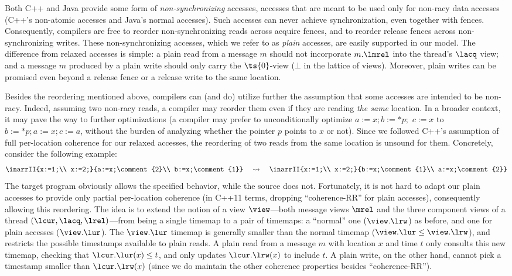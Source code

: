Both C++ and Java provide some form of \emph{non-synchronizing} accesses, \ie accesses that are meant to be used only for non-racy data accesses
(C++'s non-atomic accesses and Java's normal accesses).
Such accesses can never achieve synchronization, even together with fences.
Consequently, compilers are free to reorder non-synchronizing reads across acquire fences, and to reorder release fences across non-synchronizing writes.
These non-synchronizing accesses, which we refer to as \emph{plain} accesses, are easily supported in our model.
The difference from relaxed accesses is simple:
a plain read from a message $m$ should not incorporate $m.\lmrel$ into the thread's $\lacq$ view;
and a message $m$ produced by a plain write should only carry the $\ts{0}$-view (\ie $\bot$ in the lattice of views).
Moreover, plain writes can be promised even beyond a release fence or a release write to the same location.

Besides the reordering mentioned above, compilers can (and do) utilize further the assumption that some accesses 
are intended to be non-racy.
Indeed, assuming two non-racy reads, a compiler may reorder them even if they are reading \emph{the same} location.
In a broader context, it may pave the way to further optimizations 
(\eg a compiler may prefer to unconditionally optimize $a:=x; b:=*p;$ $c:=x$ to $b:=*p; a:=x; c:=a$, 
without the burden of analyzing whether the pointer $p$ points to $x$ or not).
Since we followed C++'s assumption of full per-location coherence for our relaxed accesses, 
the reordering of two reads from the same location is unsound for them. 
Concretely, consider the following example:
$$
\inarrII{x:=1;\\ x:=2;}{a:=x;\comment{2}\\ b:=x;\comment{1}} \quad \leadsto \quad
\inarrII{x:=1;\\ x:=2;}{b:=x;\comment{1}\\ a:=x;\comment{2}}
$$
The target program obviously allows the specified behavior, while the source does not.
Fortunately, it is not hard to adapt our plain accesses to provide only partial per-location coherence
(in C++11 terms, dropping ``coherence-RR'' for plain accesses), consequently allowing this reordering.
The idea is to extend the notion of a view $\view$---both message views $\mrel$ and the
three component views of a thread $(\lcur,\lacq,\lrel)$---from being a single timemap to a pair of timemaps:
a ``normal'' one ($\view.\lrw$) as before, and one for plain accesses ($\view.\lur$).
The $\view.\lur$ timemap is generally smaller than the normal timemap ($\view.\lur \leq \view.\lrw$),
and restricts the possible timestamps available to plain reads.
A plain read from a message $m$ with location $x$ and time $t$ only consults this new timemap,
checking that $\lcur.\lur(x) \leq t$, and only updates $\lcur.\lrw(x)$ to include $t$.
 A plain write, on the other hand, cannot pick a timestamp smaller than $\lcur.\lrw(x)$ 
(since we do maintain the other coherence properties besides ``coherence-RR'').

